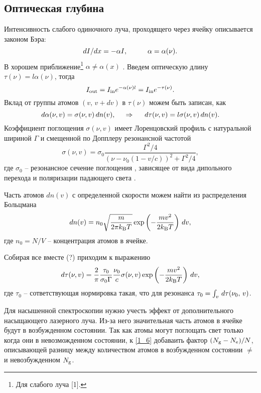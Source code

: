 \subsection{Оптическая глубина}


Интенсивность слабого одиночного луча, проходящего через ячейку описывается законом Бэра:
\begin{equation*}
    d I / d x = - \alpha I,
    \hspace{10 mm} 
    \alpha = \alpha (\nu).
\end{equation*}
В хорошем приближение\footnote{
    Для слабого луча [1].
}  $\alpha \neq \alpha(x)$ . 
Введем оптическую длину $\tau(\nu) = l \alpha(\nu)$, тогда
\begin{equation*}
    I_{\textnormal{out}} = I_{\textnormal{in}} e^{- \alpha(\nu) l} = I_{\textnormal{in}} e^{- \tau(\nu)}.
\end{equation*}
Вклад от группы атомов $(v,\, v + d v)$ в $\tau(\nu)$ можем быть записан, как
\begin{equation*}
    d \alpha (\nu, v) = \sigma(\nu, v) \, dn(v),
    \hspace{0.5cm} \Rightarrow \hspace{0.5cm}    
    d \tau(\nu, v) = l \sigma(\nu, v) \, dn(v).
\end{equation*}
Коэффициент поглощения $\sigma(\nu, v)$ имеет Лоренцовский профиль с натуральной шириной $\Gamma$ и смещенной по Допплеру резонансной частотой \cite{demtreder}
\begin{equation}
    \label{1_4}
    \sigma(\nu, v) = \sigma_0 \frac{\Gamma^2/4}{(\nu - \nu_0(1 - v / c))^2 + \Gamma^2/4},
\end{equation}
где $\sigma_0$ -- резонансное сечение поглощения
, зависящее от вида дипольного перехода и поляризации падающего света \cite{Rieger_doppler-freesaturation}. 

Часть атомов $d n (v)$ с определенной скорости можем найти из распределения Больцмана
\begin{equation*}
    d n(v) = n_0 \sqrt{\frac{m}{2 \pi k_{\textnormal{B}} T}} \exp\left(
        - \frac{m v^2}{2 k_{\textnormal{B}} T} 
    \right) \, d v,
\end{equation*} 
где $n_0 = N/V$ -- концентрация атомов в ячейке. 

Собирая все вместе (?) приходим к выражению
\begin{equation}
    \label{1_6}
    d \tau (\nu, v) = \frac{2}{\pi} \frac{\tau_0}{\sigma_0 \Gamma} \frac{\nu_0}{c} 
     \sigma(\nu, v) \exp\left(
        - \frac{m v^2}{2 k_{\textnormal{B}} T}
     \right) \, d v,
\end{equation}
где $\tau_0$  -- сответствующая нормировка такая, что для резонанса $\tau_0 = \int_v \, d \tau (\nu_0,\, v)$.



Для насышенной спектроскопии нужно учесть эффект от дополнительного насыщающего лазерного луча. Из-за него значительная часть атомов в ячейке будут в возбужденном состоянии. Так как атомы могут поглощать свет только когда они в невозможденном состоянии, к \eqref{1_6} добаваить фактор $(N_{\textnormal{g}}-N_{\textnormal{e}})/N$, описывающей разницу 
между количеством атомов в возбужденном состоянии $\ne$ и невозбужденном $N_{\textnormal{g}}$. 

